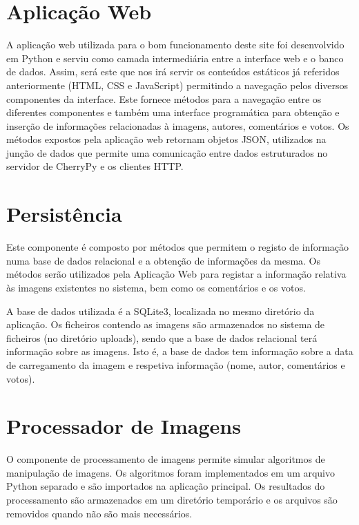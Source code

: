\documentclass{report}
\begin{document}
\chapter{Aplicação Web}
\label{chap.aplicaçao}
A aplicação web utilizada para o bom funcionamento deste site foi desenvolvido em Python e serviu como camada intermediária entre a interface web e o banco de dados. Assim, será  este que nos irá servir os conteúdos estáticos já referidos anteriormente (HTML, CSS e JavaScript) permitindo a navegação pelos diversos componentes da interface. Este fornece métodos para a navegação entre os diferentes componentes e também uma interface programática para obtenção e inserção de informações relacionadas à imagens, autores, comentários e votos. Os métodos expostos pela aplicação web retornam objetos JSON, utilizados na junção de dados que permite uma comunicação entre dados estruturados no servidor de CherryPy e os clientes HTTP.

\chapter{Persistência}
\label{chap.persistencia}

Este componente é composto por métodos que permitem o registo de informação numa base de dados relacional e a obtenção de informações da mesma. Os métodos serão utilizados pela Aplicação Web para registar a informação relativa às imagens existentes no sistema, bem como os comentários e os votos.


A base de dados utilizada é a SQLite3, localizada no mesmo diretório da aplicação. Os ficheiros contendo as imagens são armazenados no sistema de ficheiros (no diretório uploads), sendo que a base de dados relacional terá informação sobre as imagens. Isto é, a base de dados tem informação sobre a data de carregamento da imagem e respetiva informação (nome, autor, comentários e votos).



\chapter{Processador de Imagens}
\label{chap.process}

O componente de processamento de imagens permite simular algoritmos de manipulação de imagens. Os algoritmos foram implementados em um arquivo Python separado e são importados na aplicação principal. Os resultados do processamento são armazenados em um diretório temporário e os arquivos são removidos quando não são mais necessários.
\end{document}
